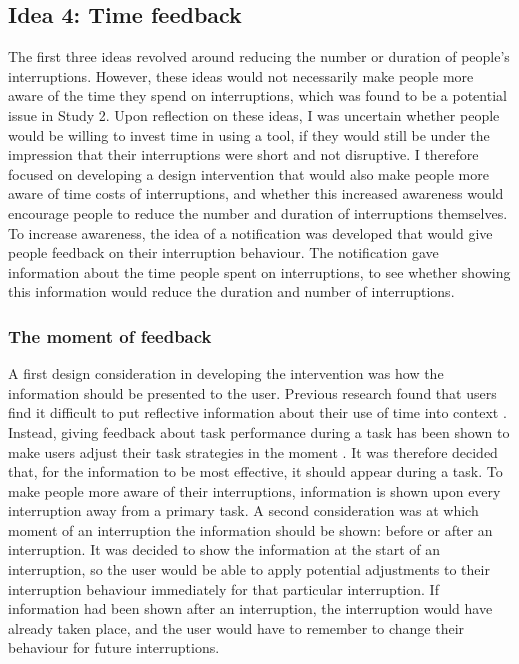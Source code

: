 \subsection{Idea 4: Time feedback}
The first three ideas revolved around reducing the number or duration of people’s interruptions. However, these ideas would not necessarily make people more aware of the time they spend on interruptions, which was found to be a potential issue in Study 2. Upon reflection on these ideas, I was uncertain whether people would be willing to invest time in using a tool, if they would still be under the impression that their interruptions were short and not disruptive. 
I therefore focused on developing a design intervention that would also make people more aware of time costs of interruptions, and whether this increased awareness would encourage people to reduce the number and duration of interruptions themselves. To increase awareness, the idea of a notification was developed that would give people feedback on their interruption behaviour. The notification gave information about the time people spent on interruptions, to see whether showing this information would reduce the duration and number of interruptions.

\subsubsection{The moment of feedback}
A first design consideration in developing the intervention was how the information should be presented to the user. Previous research found that users find it difficult to put reflective information about their use of time into context \citep{Collins2014, Whittaker2016}. Instead, giving feedback about task performance during a task has been shown to make users adjust their task strategies in the moment \citep{Maior2018, Gould2016a, Whittaker2016}. It was therefore decided that, for the information to be most effective, it should appear during a task. To make people more aware of their interruptions, information is shown upon every interruption away from a primary task. 
A second consideration was at which moment of an interruption the information should be shown: before or after an interruption. It was decided to show the information at the start of an interruption, so the user would be able to apply potential adjustments to their interruption behaviour immediately for that particular interruption. If information had been shown after an interruption, the interruption would have already taken place, and the user would have to remember to change their behaviour for future interruptions.

